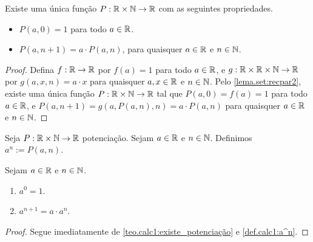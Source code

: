\begin{theorem} \label{teo.calc1:existe_potenciação}
    Existe uma única função $P : \mathbb{R} \times \mathbb{N} \to \mathbb{R}$ com as seguintes propriedades.
        \begin{itemize}
            \item $P(a,0) = 1$ para todo $a \in \mathbb{R}$.
            \item $P(a,n+1) = a \cdot P(a,n)$, para quaisquer $a \in \mathbb{R}$ e $n \in \mathbb{N}$.
        \end{itemize}
\end{theorem}

\begin{proof}
    Defina $f : \mathbb{R} \to \mathbb{R}$ por $f(a) = 1$ para todo $a \in \mathbb{R}$, e $g : \mathbb{R} \times \mathbb{R} \times \mathbb{N} \to \mathbb{R}$ por $g(a,x,n) = a \cdot x$ para quaisquer $a,x \in \mathbb{R}$ e $n \in \mathbb{N}$. Pelo \cref{lema.set:recpar2}, existe uma única função $P : \mathbb{R} \times \mathbb{N} \to \mathbb{R}$ tal que $P(a,0) = f(a) = 1$ para todo $a \in \mathbb{R}$, e $P(a,n+1) = g(a,P(a,n),n) = a \cdot P(a,n)$ para quaisquer $a \in \mathbb{R}$ e $n \in \mathbb{N}$. \blackproof
\end{proof}

\begin{definition} \label{def.calc1:a^n}
    Seja $P : \mathbb{R} \times \mathbb{N} \to \mathbb{R}$ potenciação. Sejam $a \in \mathbb{R}$ e $n \in \mathbb{N}$. Definimos $a^n := P(a,n)$.
\end{definition}

\begin{corollary}
    Sejam $a \in \mathbb{R}$ e $n \in \mathbb{N}$.
        \begin{enumerate}[leftmargin=*, align=left, label=\textbf{(\alph*)}]
            \item $a^0 = 1$.
            \item $a^{n+1} = a \cdot a^n$. 
        \end{enumerate}
\end{corollary}

\begin{proof}
    Segue imediatamente de \ref{teo.calc1:existe_potenciação} e \ref{def.calc1:a^n}. \blackproof
\end{proof}

